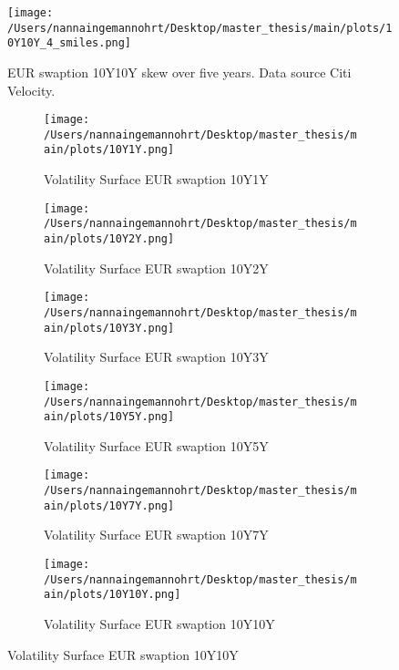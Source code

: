 \begin{figure}[H]
    \centering
    \texttt{[image: /Users/nannaingemannohrt/Desktop/master\_thesis/main/plots/10Y10Y\_4\_smiles.png]}
    \caption{EUR swaption 10Y10Y skew over five years. Data source Citi Velocity.}
    \label{fig:rates:smile_5}
\end{figure}

\newpage
\begin{figure}[H]
    \centering
    \begin{subfigure}{0.43\textwidth}
        \texttt{[image: /Users/nannaingemannohrt/Desktop/master\_thesis/main/plots/10Y1Y.png]}
        \caption{Volatility Surface EUR swaption 10Y1Y}
        \label{fig:10Y1Y_}
    \end{subfigure}\hfill
    \begin{subfigure}{0.43
        \textwidth}
        \texttt{[image: /Users/nannaingemannohrt/Desktop/master\_thesis/main/plots/10Y2Y.png]}
        \caption{Volatility Surface EUR swaption 10Y2Y}
        \label{fig:10Y2Y_}
    \end{subfigure}
    \begin{subfigure}{0.43\textwidth}
        \texttt{[image: /Users/nannaingemannohrt/Desktop/master\_thesis/main/plots/10Y3Y.png]}
        \caption{Volatility Surface EUR swaption 10Y3Y}
        \label{fig:10Y3Y_}
    \end{subfigure}\hfill
    \begin{subfigure}{0.43\textwidth}
        \texttt{[image: /Users/nannaingemannohrt/Desktop/master\_thesis/main/plots/10Y5Y.png]}
        \caption{Volatility Surface EUR swaption 10Y5Y}
        \label{fig:10Y5Y_}
    \end{subfigure}
    \begin{subfigure}{0.43\textwidth}
        \texttt{[image: /Users/nannaingemannohrt/Desktop/master\_thesis/main/plots/10Y7Y.png]}
        \caption{Volatility Surface EUR swaption 10Y7Y}
        \label{fig:10Y7Y_}
    \end{subfigure}\hfill
    \begin{subfigure}{0.43\textwidth}
        \texttt{[image: /Users/nannaingemannohrt/Desktop/master\_thesis/main/plots/10Y10Y.png]}
        \caption{Volatility Surface EUR swaption 10Y10Y}
        \label{fig:10Y10Y_}
    \end{subfigure}


\end{figure}
